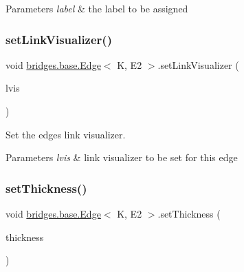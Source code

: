 \begin{DoxyParams}{Parameters}
{\em label} & the label to be assigned \\
\hline
\end{DoxyParams}
\mbox{\label{classbridges_1_1base_1_1_edge_a1bb8008507d26245468bf9d0f1452072}} 
\subsubsection{\texorpdfstring{set\+Link\+Visualizer()}{setLinkVisualizer()}}
{\footnotesize\ttfamily void \mbox{\hyperlink{classbridges_1_1base_1_1_edge}{bridges.\+base.\+Edge}}$<$ K, E2 $>$.set\+Link\+Visualizer (\begin{DoxyParamCaption}\item[{\mbox{\hyperlink{classbridges_1_1base_1_1_link_visualizer}{Link\+Visualizer}}}]{lvis }\end{DoxyParamCaption})}



Set the edge\textquotesingle{}s link visualizer. 


\begin{DoxyParams}{Parameters}
{\em lvis} & link visualizer to be set for this edge \\
\hline
\end{DoxyParams}
\mbox{\label{classbridges_1_1base_1_1_edge_ae8d87539f03f04479e5f5710ea9bf260}} 
\subsubsection{\texorpdfstring{set\+Thickness()}{setThickness()}}
{\footnotesize\ttfamily void \mbox{\hyperlink{classbridges_1_1base_1_1_edge}{bridges.\+base.\+Edge}}$<$ K, E2 $>$.set\+Thickness (\begin{DoxyParamCaption}\item[{double}]{thickness }\end{DoxyParamCaption})}



